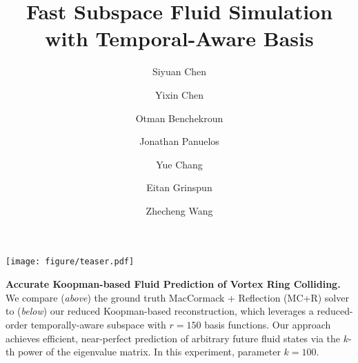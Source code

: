 \documentclass[acmtog,authorversion,nonacm]{acmart}
\begin{document}
\title{Fast Subspace Fluid Simulation with Temporal-Aware Basis}

\author{Siyuan Chen}
\orcid{}

\author{Yixin Chen}
\orcid{}

\author{Otman Benchekroun}
\orcid{}

\author{Jonathan Panuelos}
\orcid{}

\author{Yue Chang}

\author{Eitan Grinspun}
\orcid{}

\author{Zhecheng Wang}

\renewcommand{\shortauthors}{Chen et al.}





\begin{teaserfigure}
  \centering
  \texttt{[image: figure/teaser.pdf]}
  \caption{\textbf{Accurate Koopman-based Fluid Prediction of Vortex Ring Colliding.} We compare (\emph{above}) the ground truth MacCormack + Reflection (MC+R) solver \cite{zehnder2018advection} to (\emph{below}) our reduced Koopman-based reconstruction, which leverages a reduced-order temporally-aware subspace with $r=150$ basis functions. Our approach achieves efficient, near-perfect prediction of arbitrary future fluid states via the $k$-th power of the eigenvalue matrix. In this experiment, parameter $k=100$.} 
  \label{fig:teaser}
  \Description{}
\end{teaserfigure}
\end{document}
